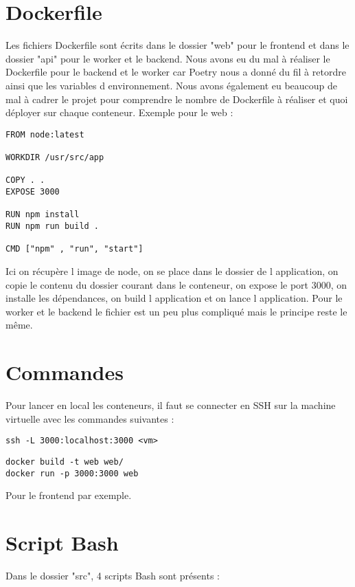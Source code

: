 \documentclass{report}
\begin{document}
\newpage

\chapter{Dockerfile}
Les fichiers Dockerfile sont écrits dans le dossier "web" pour le frontend et dans le dossier "api" pour le worker et le backend. Nous avons eu du mal à réaliser le Dockerfile pour le backend et le worker car Poetry nous a donné du fil à retordre ainsi que les variables d environnement. Nous avons également eu beaucoup de mal à cadrer le projet pour comprendre le nombre de Dockerfile à réaliser et quoi déployer sur chaque conteneur.
Exemple pour le web :
\begin{verbatim}
FROM node:latest    

WORKDIR /usr/src/app

COPY . .
EXPOSE 3000

RUN npm install 
RUN npm run build . 

CMD ["npm" , "run", "start"]
\end{verbatim}
Ici on récupère l image de node, on se place dans le dossier de l application, on copie le contenu du dossier courant dans le conteneur, on expose le port 3000, on installe les dépendances, on build l application et on lance l application.
Pour le worker et le backend le fichier est un peu plus compliqué mais le principe reste le même.
\newpage

\chapter{Commandes}
Pour lancer en local les conteneurs, il faut se connecter en SSH sur la machine virtuelle avec les commandes suivantes :

\begin{verbatim}
ssh -L 3000:localhost:3000 <vm>
\end{verbatim}

\begin{verbatim}
docker build -t web web/
docker run -p 3000:3000 web
\end{verbatim}

Pour le frontend par exemple.

\newpage

\chapter{Script Bash}
Dans le dossier "src", 4 scripts Bash sont présents :
\end{document}
